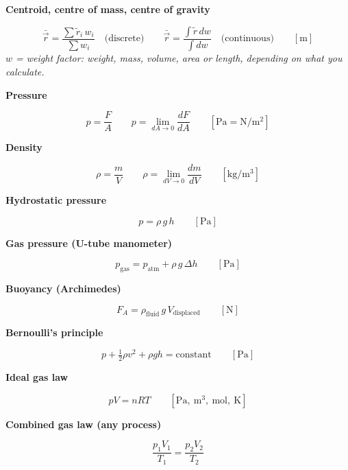 \documentclass[11pt]{article}
\newcommand{\sub}[1]{\par\medskip\textbf{#1}\par}
\newcommand{\expl}[1]{{\color{gray}\itshape #1}\par}
\begin{document}
\sub{Centroid, centre of mass, centre of gravity}
\[ \bar{\vec r} = \frac{\sum \tilde r_i\,w_i}{\sum w_i} \quad\text{(discrete)} \qquad \bar{\vec r} = \frac{\int \tilde r\,dw}{\int dw} \quad\text{(continuous)} \qquad [\mathrm{m}] \]
\expl{$w$ = weight factor: weight, mass, volume, area or length, depending on what you calculate.}

\sub{Pressure}
\[ p = \frac{F}{A} \qquad p = \lim_{dA\to 0}\frac{dF}{dA} \qquad [\mathrm{Pa} = \mathrm{N/m^2}] \]

\sub{Density}
\[ \rho = \frac{m}{V} \qquad \rho = \lim_{dV\to 0}\frac{dm}{dV} \qquad [\mathrm{kg/m^3}] \]

\sub{Hydrostatic pressure}
\[ p = \rho\,g\,h \qquad [\mathrm{Pa}] \]

\sub{Gas pressure (U-tube manometer)}
\[ p_{\text{gas}} = p_{\text{atm}} + \rho\,g\,\Delta h \qquad [\mathrm{Pa}] \]

\sub{Buoyancy (Archimedes)}
\[ F_A = \rho_{\text{fluid}}\,g\,V_{\text{displaced}} \qquad [\mathrm{N}] \]

\sub{Bernoulli's principle}
\[ p + \tfrac{1}{2}\rho v^2 + \rho g h = \text{constant} \qquad [\mathrm{Pa}] \]

\sub{Ideal gas law}
\[ pV = nRT \qquad [\mathrm{Pa},\ \mathrm{m^3},\ \mathrm{mol},\ \mathrm{K}] \]

\sub{Combined gas law (any process)}
\[ \frac{p_1 V_1}{T_1} = \frac{p_2 V_2}{T_2} \]
\end{document}
